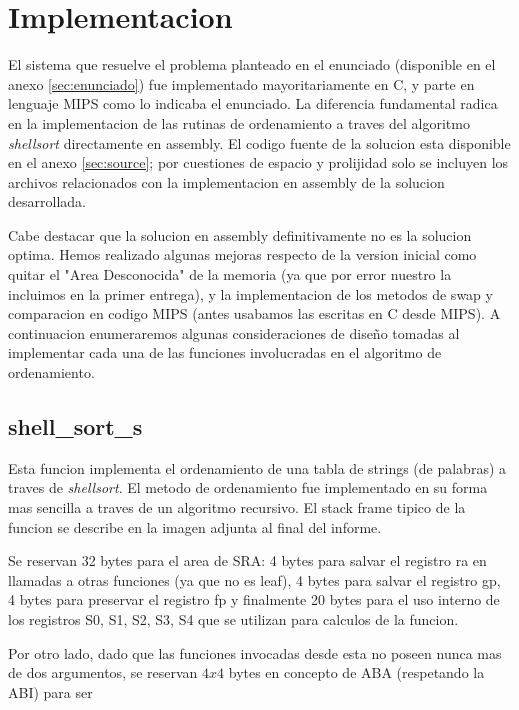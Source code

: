 \documentclass[a4paper,11pt]{article}
\begin{document}
\section{Implementacion}

El sistema que resuelve el problema planteado en el enunciado (disponible en el
anexo \ref{sec:enunciado}) fue implementado mayoritariamente en C, y parte en 
lenguaje MIPS como lo indicaba el enunciado. La diferencia fundamental radica 
en la implementacion de las rutinas de ordenamiento a traves del algoritmo 
\textit{shellsort} directamente en assembly. El codigo fuente de
la solucion esta disponible en el anexo \ref{sec:source}; por cuestiones de
espacio y prolijidad solo se incluyen los archivos relacionados con la
implementacion en assembly de la solucion desarrollada.

Cabe destacar que la solucion en assembly definitivamente no es la solucion
optima. Hemos realizado algunas mejoras respecto de la version inicial como quitar el "Area Desconocida" de la memoria (ya que por error nuestro la incluimos en la primer entrega), y la implementacion de los metodos de swap y comparacion en codigo MIPS (antes usabamos las escritas en C desde MIPS).
A continuacion enumeraremos algunas consideraciones de diseño tomadas al
implementar cada una de las funciones involucradas en el algoritmo de
ordenamiento.

\subsection{shell\_sort\_s}

Esta funcion implementa el ordenamiento de una tabla de strings (de palabras) a traves de
\textit{shellsort}. El metodo de ordenamiento fue implementado en su forma mas
sencilla a traves de un algoritmo recursivo. El stack frame tipico de la
funcion se describe en la imagen adjunta al final del informe.

\FloatBarrier

Se reservan 32 bytes para el area de SRA: 4 bytes para salvar el registro ra en llamadas a otras funciones (ya que no es leaf), 4 bytes para salvar el registro gp, 4 bytes para preservar el registro fp y finalmente 20 bytes para el uso interno de los registros S0, S1, S2, S3, S4 que se utilizan para calculos de la funcion.

Por otro lado, dado que las funciones invocadas desde esta no poseen nunca mas
de dos argumentos, se reservan \(4 x 4\) bytes en concepto de ABA (respetando la ABI) para ser
\end{document}
